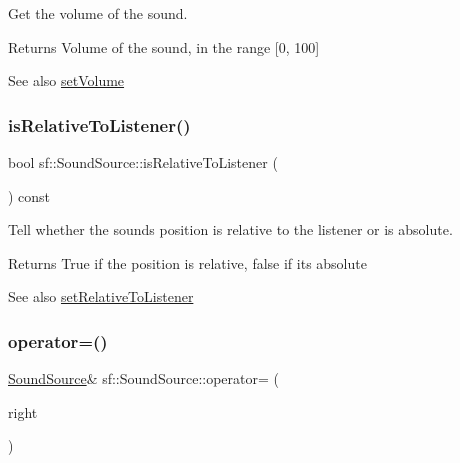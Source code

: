 Get the volume of the sound. 

\begin{DoxyReturn}{Returns}
Volume of the sound, in the range \mbox{[}0, 100\mbox{]}
\end{DoxyReturn}
\begin{DoxySeeAlso}{See also}
\hyperlink{classsf_1_1_sound_source_a2f192f2b49fb8e2b82f3498d3663fcc2}{set\+Volume} 
\end{DoxySeeAlso}
\mbox{\label{classsf_1_1_sound_source_adcdb4ef32c2f4481d34aff0b5c31534b}} 
\subsubsection{\texorpdfstring{is\+Relative\+To\+Listener()}{isRelativeToListener()}}
{\footnotesize\ttfamily bool sf\+::\+Sound\+Source\+::is\+Relative\+To\+Listener (\begin{DoxyParamCaption}{ }\end{DoxyParamCaption}) const}



Tell whether the sound\textquotesingle{}s position is relative to the listener or is absolute. 

\begin{DoxyReturn}{Returns}
True if the position is relative, false if it\textquotesingle{}s absolute
\end{DoxyReturn}
\begin{DoxySeeAlso}{See also}
\hyperlink{classsf_1_1_sound_source_ac478a8b813faf7dd575635b102081d0d}{set\+Relative\+To\+Listener} 
\end{DoxySeeAlso}
\mbox{\label{classsf_1_1_sound_source_a355a07f34b5ecc38465d39a33b701b6d}} 
\subsubsection{\texorpdfstring{operator=()}{operator=()}}
{\footnotesize\ttfamily \hyperlink{classsf_1_1_sound_source}{Sound\+Source}\& sf\+::\+Sound\+Source\+::operator= (\begin{DoxyParamCaption}\item[{const \hyperlink{classsf_1_1_sound_source}{Sound\+Source} \&}]{right }\end{DoxyParamCaption})}



